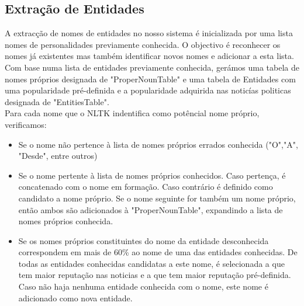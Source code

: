 \subsection{Extração de Entidades}
\label{sec:entity_extraction}
\hspace{15pt}A extracção de nomes de entidades no nosso sistema é inicializada por uma lista nomes de personalidades previamente conhecida. O objectivo é reconhecer os nomes já existentes mas também identificar novos nomes e adicionar a esta lista. \\
Com base numa lista de entidades previamente conhecida, gerámos uma tabela de nomes próprios designada de "ProperNounTable" e uma tabela de Entidades com uma popularidade pré-definida e a popularidade adquirida nas noticías politicas designada de "EntitiesTable".\\
Para cada nome que o NLTK indentifica como potêncial nome próprio, verificamos:
\begin{itemize}
\item Se o nome não pertence à lista de nomes próprios errados conhecida ("O","A", "Desde", entre outros)

\item Se o nome pertente à lista de nomes próprios conhecidos. Caso pertença, é concatenado com o nome em formação. Caso contrário é definido como candidato a nome próprio. Se o nome seguinte for também um nome próprio, então ambos são adicionados à "ProperNounTable", expandindo a lista de nomes próprios conhecida. 

\item Se os nomes próprios constituintes do nome da entidade desconhecida correspondem em mais de 60\% ao nome de uma das entidades conhecidas. De todas as entidades conhecidas candidatas a este nome, é selecionada a que tem maior reputação nas noticias e a que tem maior reputação pré-definida. Caso não haja nenhuma entidade conhecida com o nome, este nome é adicionado como nova entidade.
\end{itemize}

